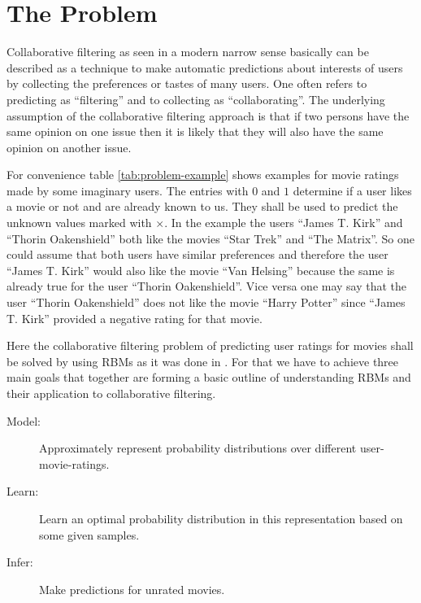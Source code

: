 \documentclass[crop=false,10pt]{standalone}
\begin{document}
  \section{The Problem} %
  \label{sec:the_problem}
    \begin{table*}
      \center
      \caption{%
        The table shows examples of binary ratings for movies made by some imaginary users.
        Every row represents a user and every column a movie.
        The number $0$ is used to point out that the user does not like the movie and $1$ for the opposite.
        The symbol $\times$ is used if there was no rating for the movie by this user.
      }
      \label{tab:problem-example}
      \small
      
    \end{table*}
    Collaborative filtering as seen in a modern narrow sense basically can be described as a technique to make automatic predictions about interests of users by collecting the preferences or tastes of many users.
    One often refers  to predicting as \enquote{filtering} and to collecting as \enquote{collaborating}.
    The underlying assumption of the collaborative filtering approach is that if two persons have the same opinion on one issue then it is likely that they will also have the same opinion on another issue.
    \cite{WikipediaCollaborativeFiltering}

    For convenience table \ref{tab:problem-example} shows examples for movie ratings made by some imaginary users.
    The entries with $0$ and $1$ determine if a user likes a movie or not and are already known to us.
    They shall be used to predict the unknown values marked with $\times$.
    In the example the users \enquote{James T. Kirk} and \enquote{Thorin Oakenshield} both like the movies \enquote{Star Trek} and \enquote{The Matrix}.
    So one could assume that both users have similar preferences and therefore the user \enquote{James T. Kirk} would also like the movie \enquote{Van Helsing} because the same is already true for the user \enquote{Thorin Oakenshield}.
    Vice versa one may say that the user \enquote{Thorin Oakenshield} does not like the movie \enquote{Harry Potter} since \enquote{James T. Kirk} provided a negative rating for that movie.

    Here the collaborative filtering problem of predicting user ratings for movies shall be solved by using RBMs as it was done in \cite{Hinton2007}.
    For that we have to achieve three main goals that together are forming a basic outline of understanding RBMs and their application to collaborative filtering.
    \begin{description}
      \item[Model:]{%
        Approximately represent probability distributions over different user-movie-ratings.
      }
      \item[Learn:]{%
        Learn an optimal probability distribution in this representation based on some given samples.
      }
      \item[Infer:]{%
        Make predictions for unrated movies.
      }
    \end{description}
\end{document}
